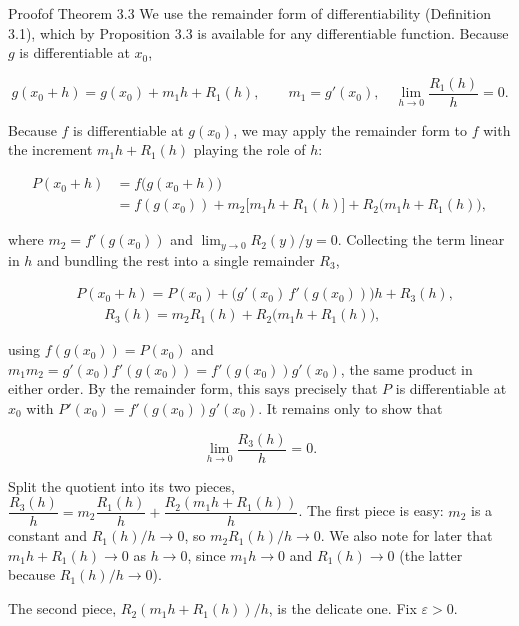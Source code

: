 \begin{hkproof}{Proof}{}{of Theorem 3.3}
We use the remainder form of differentiability (Definition 3.1), which by Proposition 3.3 is available for any differentiable function. Because \(g\) is differentiable at \(x_{0}\),

\[ g(x_{0} + h) = g(x_{0}) + m_{1} h + R_{1}(h), \qquad m_{1} = g'(x_{0}), \quad \lim_{h \to 0}\frac{R_{1}(h)}{h} = 0. \]

Because \(f\) is differentiable at \(g(x_{0})\), we may apply the remainder form to \(f\) with the increment \(m_{1} h + R_{1}(h)\) playing the role of \(h\):

\[ \begin{aligned}
        P(x_{0}+h)
          &= f\bigl(g(x_{0}+h)\bigr) \\[2pt]
          &= f(g(x_{0})) + m_{2}\bigl[m_{1} h + R_{1}(h)\bigr] + R_{2}\bigl(m_{1} h + R_{1}(h)\bigr),
      \end{aligned} \]

where \(m_{2} = f'(g(x_{0}))\) and \(\lim_{y \to 0} R_{2}(y)/y = 0\). Collecting the term linear in \(h\) and bundling the rest into a single remainder \(R_{3}\),

\[ \begin{aligned}
        &P(x_{0}+h) = P(x_{0}) + \bigl(g'(x_{0})\,f'(g(x_{0}))\bigr) h + R_{3}(h), \\[2pt]
        &\qquad R_{3}(h) = m_{2} R_{1}(h) + R_{2}\bigl(m_{1} h + R_{1}(h)\bigr),
      \end{aligned} \]

using \(f(g(x_{0})) = P(x_{0})\) and \(m_{1} m_{2} = g'(x_{0})f'(g(x_{0})) = f'(g(x_{0}))g'(x_{0})\), the same product in either order. By the remainder form, this says precisely that \(P\) is differentiable at \(x_{0}\) with \(P'(x_{0}) = f'(g(x_{0}))g'(x_{0})\). It remains only to show that

\[ \lim_{h \to 0}\frac{R_{3}(h)}{h} = 0. \]

Split the quotient into its two pieces, \(\dfrac{R_{3}(h)}{h} = m_{2}\dfrac{R_{1}(h)}{h} + \dfrac{R_{2}(m_{1} h + R_{1}(h))}{h}\). The first piece is easy: \(m_{2}\) is a constant and \(R_{1}(h)/h \to 0\), so \(m_{2} R_{1}(h)/h \to 0\). We also note for later that \(m_{1} h + R_{1}(h) \to 0\) as \(h \to 0\), since \(m_{1} h \to 0\) and \(R_{1}(h) \to 0\) (the latter because \(R_{1}(h)/h \to 0\)).

The second piece, \(R_{2}(m_{1} h + R_{1}(h))/h\), is the delicate one. Fix \(\varepsilon > 0\).


\end{hkproof}
